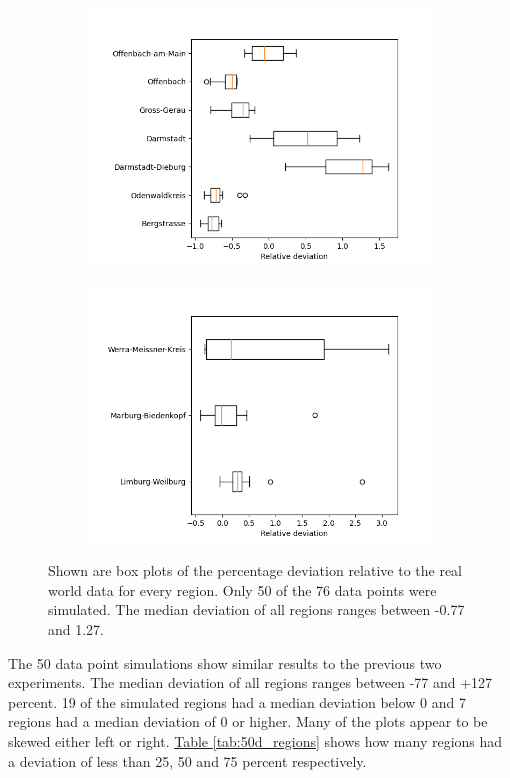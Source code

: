 \begin{figure}[h]
\begin{subfigure}[b]{0.4\textwidth}
		\includegraphics[width=\textwidth]{./figures/50d/deviation_box50_3.png}	
	\end{subfigure}
	\begin{subfigure}[b]{0.4\textwidth}
		\centering
		\includegraphics[width=\textwidth]{./figures/50d/deviation_box50_4.png}	
	\end{subfigure}
	\caption{Shown are box plots of the percentage deviation relative to the real world data for every region. Only 50
		of the 76 data points were simulated. The median deviation of all regions ranges between -0.77 and 1.27.		}
	\label{fig:50_sim_box}
\end{figure}

The 50 data point simulations show similar results to the previous two experiments. The median deviation of all regions
ranges between -77 and +127 percent. 19 of the simulated regions had a median deviation below 0 and 7 regions had a
median deviation of 0 or higher. Many of the plots appear to be skewed either left or right.
\hyperref[tab:50d_regions]{Table \ref*{tab:50d_regions}} shows how many regions had a deviation of less than 25, 50 and 75
percent respectively.\newline

